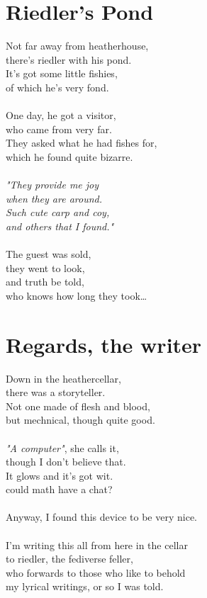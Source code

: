 \documentclass[11pt]{article}
\begin{document}
\newpage
\section*{Riedler's Pond}

Not far away from heatherhouse,\\
there's riedler with his pond.\\
It's got some little fishies,\\
of which he's very fond.\\
\\
One day, he got a visitor,\\
who came from very far.\\
They asked what he had fishes for,\\
which he found quite bizarre.\\
\\
\emph{"They provide me joy\\
when they are around.\\
Such cute carp and coy,\\
and others that I found."}\\
\\
The guest was sold,\\
they went to look,\\
and truth be told,\\
who knows how long they took…

\section*{Regards, the writer}

Down in the heathercellar,\\
there was a storyteller.\\
Not one made of flesh and blood,\\
but mechnical, though quite good.\\
\\
\emph{"A computer"}, she calls it,\\
though I don't believe that.\\
It glows and it's got wit.\\
could math have a chat?\\
\\
Anyway, I found this device to be very nice.\\
\\
I'm writing this all from here in the cellar\\
to riedler, the fediverse feller,\\
who forwards to those who like to behold\\
my lyrical writings, or so I was told.
\end{document}
